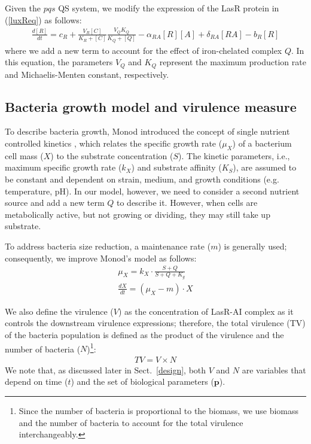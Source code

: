 \documentclass[runningheads]{llncs}
\begin{document}
Given the $pqs$ QS system, we modify the expression of the LasR protein in (\ref{luxReq}) as follows:
\begingroup\makeatletter\def\f@size{9}\check@mathfonts
\def\maketag@@@#1{\hbox{\m@th\small\normalfont#1}}%
\begin{align}
\frac{d[R]}{dt} = c_{R}+\frac{V_{R}[C]}{K_{R}+[C]}\frac{V_{Q}K_{Q}}{K_{Q} + [Q] } - \alpha_{RA}[R][A]+ \delta_{RA}[RA] -b_{R}[R]
\end{align}\endgroup
where we add a new term to account for the effect of iron-chelated complex $Q$. In this equation, the parameters $V_Q$ and $K_Q$ represent the maximum production rate and Michaelis-Menten constant, respectively. 

\subsection{Bacteria growth model and virulence measure}
To describe bacteria growth, Monod introduced the concept of single nutrient controlled kinetics \cite{Monod1949}, which relates the specific growth rate ($\mu_{X}$) of a bacterium cell mass ($X$) to the substrate concentration ($S$). The kinetic parameters, i.e., maximum specific growth rate ($k_{X}$) and substrate affinity ($K_{S}$), are assumed to be constant and dependent on strain, medium, and growth conditions (e.g. temperature, pH). In our model, however, we need to consider a second nutrient source and add a new term $Q$ to describe it. However, when cells are metabolically active, but not growing or dividing, they may still take up substrate. 

To address bacteria size reduction, a maintenance rate ($m$) is generally used; consequently, we improve Monod's model as follows:
\begin{eqnarray}
\label{eq:BioGrowthMaintenance}
&\mu_{X} = k_{X} \cdot \frac{S+Q}{S+Q+K_{g}}& \\
&\frac{dX}{dt} = (\mu_{X}-m)\cdot X&
\end{eqnarray}

We also define the virulence ($V$) as the concentration of LasR-AI complex as it controls the downstream virulence expressions; therefore, the total virulence (TV) of the bacteria population is defined as the product of the virulence and the number of bacteria ($N$)\footnote{Since the number of bacteria is proportional to the biomass, we use biomass and the number of bacteria to account for the total virulence interchangeably. }:
\begin{align}
TV = V \times N 
\label{obj}
\end{align}
We note that, as discussed later in Sect.~\ref{design}, both $V$ and $N$ are variables that depend on time ($t$) and the set of biological parameters ($\mathbf{p}$).
\end{document}
